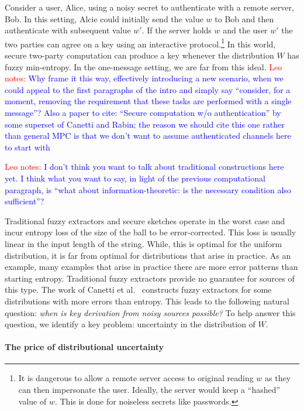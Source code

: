 \documentclass[11pt]{article}
\newcommand{\authnote}[2]{{\textcolor{red}{\textsf{#1 notes: }\textcolor{blue}{ #2}}\marginpar{\textcolor{red}{\textbf{!!!!!}}}}}
\newcommand{\authnote}[2]{}
\newcommand{\lnote}[1]{{\authnote{Leo}{#1}}}
\begin{document}
Consider a user, Alice, using a noisy secret to authenticate with a remote server, Bob.  In this setting, Alcie could initially send the value $w$ to Bob and then authenticate with subsequent value $w'$.  If the server holds $w$ and the user $w'$ the two parties can agree on a key using an interactive protocol.\footnote{It is dangerous to allow a remote server access to original reading $w$ as they can then impersonate the user.  Ideally, the server would keep a ``hashed'' value of $w$.  This is  done for noiseless secrets like passwords.}  In this world, secure two-party computation can produce a key whenever the distribution $W$ has fuzzy min-entropy.
In the one-message setting, we are far from this ideal. \lnote{Why frame it this way, effectively introducing a new scenario, when we could appeal to the first paragraphs of the intro and simply say ``consider, for a moment, removing the requirement that these tasks are performed with a single message''? Also a paper to cite: ``Secure computation w/o authentication'' by some superset of Canetti and Rabin; the reason we should cite this one rather than general MPC is that we don't want to assume authenticated channels here to start with}


\lnote{I don't think you want to talk about traditional constructions here yet. I think what you want to say, in light of the previous computational paragraph, is ``what about information-theoretic: is the necessary condition also sufficient''?}

Traditional fuzzy extractors and secure sketches operate in the worst case and incur entropy loss of the size of the ball to be error-corrected.  This loss is usually linear in the input length of the string.  While, this is optimal for the uniform distribution, it is far from optimal for distributions that arise in practice.  As an example, many examples that arise in practice there are more error patterns than starting entropy.  Traditional fuzzy extractors provide no guarantee for sources of this type.  The work of Canetti et al.~\cite{canetti2014key} constructs fuzzy  extractors for some distributions with more errors than entropy.  This leads to the following natural question: \emph{when is key derivation from noisy sources possible?}  To help answer this question, we identify a key problem: uncertainty in the distribution of $W$.

\paragraph{The price of distributional uncertainty}
\end{document}
